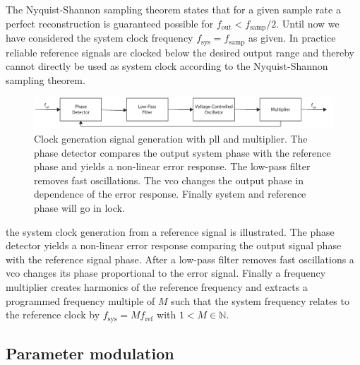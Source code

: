 The Nyquist-Shannon sampling theorem states that for a given sample rate a
perfect reconstruction is guaranteed possible for
$f_\text{out}<f_\text{samp}/2$. Until now we have considered the system clock
frequency $f_\text{sys}=f_\text{samp}$ as given. In practice reliable
reference signals are clocked below the desired output range and thereby
cannot directly be used as system clock according to the Nyquist-Shannon
sampling theorem.
\begin{figure}[htb]
  \centering
  \includegraphics[width=\textwidth]
  {../figure/digital-signal-synthesis/clock-generation.pdf}
  \caption{Clock generation signal generation with \gls{pll} and multiplier.
    The phase detector compares the output system phase with the reference
    phase and yields a non-linear error response. The low-pass filter removes
    fast oscillations. The \gls{vco} changes the output phase in dependence
    of the error response. Finally system and reference phase will go in lock.
    }\label{fig:dds_clock_generation}
\end{figure}
 the system clock generation from a reference
signal is illustrated. The phase detector yields a non-linear error response
comparing the output signal phase with the reference signal phase. After a
low-pass filter removes fast oscillations a \gls{vco} changes its phase
proportional to the error signal. Finally a frequency multiplier creates
harmonics of the reference frequency and extracts a programmed frequency
multiple of $M$ such that the system frequency relates to the reference
clock by $f_\text{sys}=Mf_\text{ref}$ with $1<M\in\mathbb{N}$.

\subsection{Parameter modulation}

